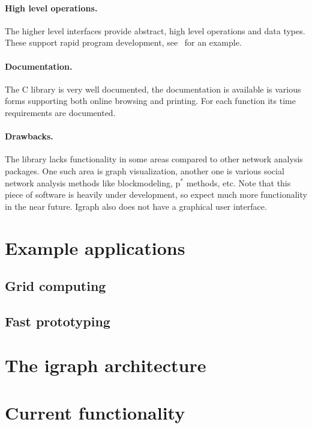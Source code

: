 \documentclass[twoside]{book}%
\begin{document}
\paragraph{High level operations.} The higher level interfaces provide
abstract, high level operations and data types. These support rapid
program development, see~ for an example.

\paragraph{Documentation.} The C library is very well documented, the
documentation is available is various forms supporting both online
browsing and printing. For each function its time requirements are
documented.

\paragraph{Drawbacks.} The library lacks functionality in some areas
compared to other network analysis packages. One such area is graph
visualization, another one is various social network analysis methods
like blockmodeling, p$^{*}$ methods, etc. Note that this piece of
software is heavily under development, so expect much more
functionality in the near future. Igraph also does not have a
graphical user interface.

\section{Example applications}

\subsection{Grid computing}

\subsection{Fast prototyping}

\section{The igraph architecture}

\section{Current functionality}
\end{document}
